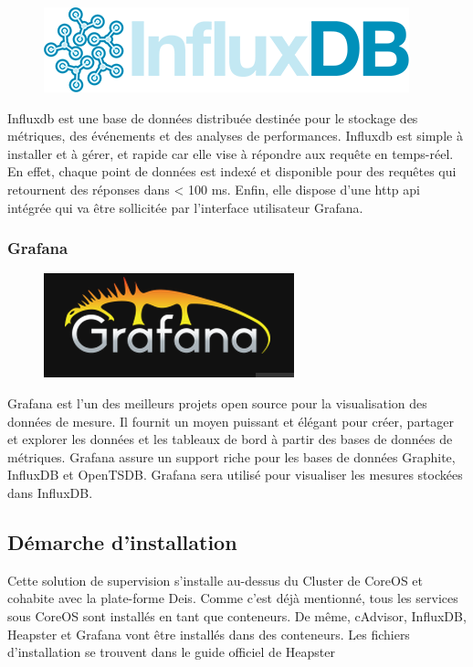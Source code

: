 \begin{onehalfspace}
\begin{figure}
\centering
\includegraphics[scale=0.2]{chapitre5/assets/influxdb}
\end{figure}
\noindent Influxdb est une base de données distribuée destinée pour le stockage des métriques, des événements et des analyses de performances. Influxdb est simple à installer et à gérer, et rapide car elle vise à répondre aux requête en temps-réel. En effet, chaque point de données est indexé et disponible pour des requêtes qui retournent des réponses dans < 100 ms. Enfin, elle dispose d'une \acrshort{http} \acrshort{api} intégrée qui va être sollicitée par l'interface utilisateur Grafana.

\subsubsection*{Grafana}

\begin{figure}
\centering
\includegraphics[scale=0.3]{chapitre5/assets/grafana}
\end{figure}
\noindent Grafana est l'un des meilleurs projets open source pour la visualisation des données de mesure. Il fournit un moyen puissant et élégant pour créer, partager et explorer les données et les tableaux de bord à partir des bases de données de métriques. Grafana assure un support riche pour les bases de données Graphite, InfluxDB et OpenTSDB. Grafana sera utilisé pour visualiser les mesures stockées dans InfluxDB.


\subsection{Démarche d'installation}

Cette solution de supervision s'installe au-dessus du Cluster de CoreOS et cohabite avec la plate-forme Deis. Comme c'est déjà mentionné, tous les services sous CoreOS sont installés en tant que conteneurs. De même, cAdvisor, InfluxDB, Heapster et Grafana vont être installés dans des conteneurs.
Les fichiers d'installation se trouvent dans le guide officiel de Heapster \cite{heapster-coreos}


\end{onehalfspace}
